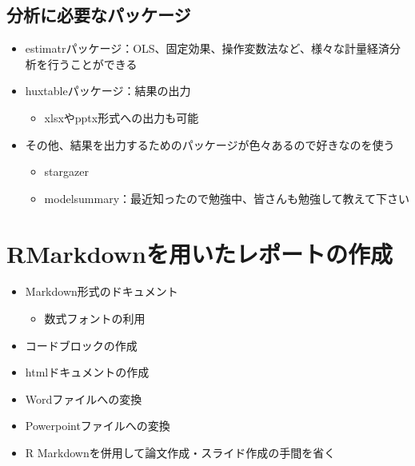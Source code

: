 \documentclass[
]{ltjsarticle}
\providecommand{\tightlist}{%
  \setlength{\itemsep}{0pt}\setlength{\parskip}{0pt}}
\begin{document}
\hypertarget{ux5206ux6790ux306bux5fc5ux8981ux306aux30d1ux30c3ux30b1ux30fcux30b8}{%
\subsection{分析に必要なパッケージ}\label{ux5206ux6790ux306bux5fc5ux8981ux306aux30d1ux30c3ux30b1ux30fcux30b8}}

\begin{itemize}
\tightlist
\item
  estimatrパッケージ：OLS、固定効果、操作変数法など、様々な計量経済分析を行うことができる
\item
  huxtableパッケージ：結果の出力

  \begin{itemize}
  \tightlist
  \item
    xlsxやpptx形式への出力も可能
  \end{itemize}
\item
  その他、結果を出力するためのパッケージが色々あるので好きなのを使う

  \begin{itemize}
  \tightlist
  \item
    stargazer
  \item
    modelsummary：最近知ったので勉強中、皆さんも勉強して教えて下さい
  \end{itemize}
\end{itemize}

\hypertarget{section}{%
\subsection{}\label{section}}

\hypertarget{rmarkdownux3092ux7528ux3044ux305fux30ecux30ddux30fcux30c8ux306eux4f5cux6210}{%
\section{RMarkdownを用いたレポートの作成}\label{rmarkdownux3092ux7528ux3044ux305fux30ecux30ddux30fcux30c8ux306eux4f5cux6210}}

\begin{itemize}
\tightlist
\item
  Markdown形式のドキュメント

  \begin{itemize}
  \tightlist
  \item
    数式フォントの利用
  \end{itemize}
\item
  コードブロックの作成
\item
  htmlドキュメントの作成
\item
  Wordファイルへの変換
\item
  Powerpointファイルへの変換
\item
  R Markdownを併用して論文作成・スライド作成の手間を省く
\end{itemize}
\end{document}
